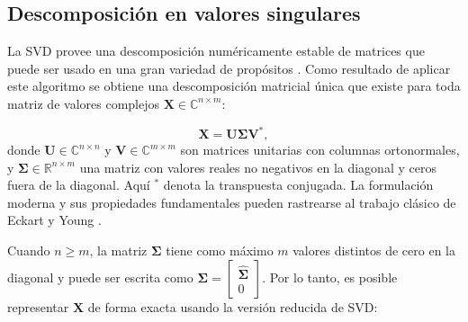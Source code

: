 %
%
%
%

\subsection*{Descomposición en valores singulares}\label{subsec:svd}

La SVD provee una descomposición numéricamente estable de matrices que puede ser usado en una gran variedad de propósitos \cite{GolubKahan1965}. Como resultado de aplicar este algoritmo se obtiene una descomposición matricial única que existe para toda matriz de valores complejos $\mathbf{X} \in \mathbb{C}^{n \times m}$:

\begin{equation}
	\mathbf{X} = \mathbf{U} \mathbf{\Sigma} \mathbf{V}^*,
\end{equation}
donde $\mathbf{U} \in \mathbb{C}^{n \times n}$ y $\mathbf{V} \in \mathbb{C}^{m \times m}$ son matrices unitarias con columnas ortonormales, y $\mathbf{\Sigma} \in \mathbb{R}^{n \times m}$ una matriz con valores reales no negativos en la diagonal y ceros fuera de la diagonal. Aquí $^*$ denota la transpuesta conjugada. La formulación moderna y sus propiedades fundamentales pueden rastrearse al trabajo clásico de Eckart y Young \cite{EckartYoung1936}.

Cuando $n \ge m$, la matriz $\mathbf{\Sigma}$ tiene como máximo $m$ valores distintos de cero en la diagonal y puede ser escrita como $\mathbf{\Sigma} = \begin{bmatrix}\hat{\mathbf{\Sigma}} \\ 0\end{bmatrix}$. Por lo tanto, es posible representar $\mathbf{X}$ de forma exacta usando la versión reducida de SVD:

